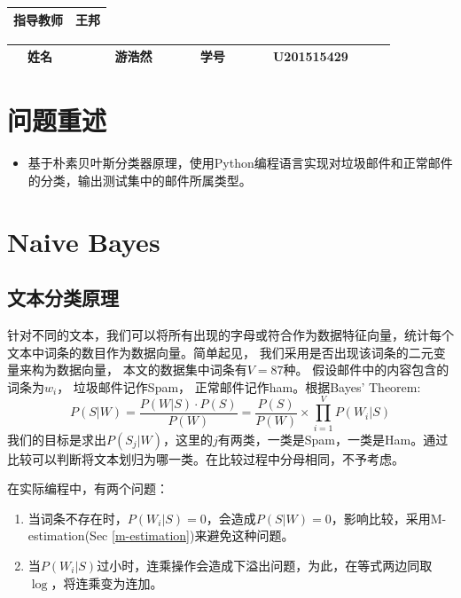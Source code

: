 \documentclass[UTF-8, a4paper, 11pt]{article}
\numberwithin{equation}{section}
\begin{document}
\begin{titlepage}
\begin{center}
\begin{table}[!hbp]
\begin{tabular}{|c|c|}
     		\hline
     		指导教师 & 王邦 \\
     		\hline
     		\end{tabular}     		
       \end{table}
       \vspace{2cm}
      \begin{table}[htbp]
      \centering
      \renewcommand\arraystretch{1.5}
     	\begin{tabular}{|c|c|c|c|}
     		\hline
            \qquad ~~姓名~~~~~  & \qquad ~~游浩然~~~~~  & \qquad 学号~~~~~ & \qquad U201515429~~~~~ \\
     		\hline
     		\end{tabular}
       \end{table}
       \date{2018年5月20日}
     \end{center}
\end{titlepage}

\section{问题重述}
\begin{itemize}
  \item 基于朴素贝叶斯分类器原理，使用Python编程语言实现对垃圾邮件和正常邮件的分类，输出测试集中的邮件所属类型。
\end{itemize}

\section{Naive Bayes}
\subsection{文本分类原理}
针对不同的文本，我们可以将所有出现的字母或符合作为数据特征向量，统计每个文本中词条的数目作为数据向量。简单起见， 我们采用是否出现该词条的二元变量来构为数据向量， 本文的数据集中词条有$V=87$种。
假设邮件中的内容包含的词条为$w_i$， 垃圾邮件记作Spam， 正常邮件记作ham。根据Bayes' Theorem:
\begin{equation}\label{ep:eqs}
  P(S|W)=\frac{P(W|S) \cdot P(S)}{P(W)} = \frac{P(S)}{P(W)}\times \prod_{i=1}^{V} P(W_i|S)
\end{equation}
我们的目标是求出$P(S_j|W)$，这里的$j$有两类，一类是Spam，一类是Ham。通过比较可以判断将文本划归为哪一类。在比较过程中分母相同，不予考虑。

在实际编程中，有两个问题：
\begin{enumerate}
  \item 当词条不存在时，$P(W_i|S)=0$，会造成$P(S|W)=0$，影响比较，采用M-estimation(Sec \ref{m-estimation})来避免这种问题。
  \item 当$P(W_i|S)$过小时，连乘操作会造成下溢出问题，为此，在等式两边同取$\log$，将连乘变为连加。
\end{enumerate}
\end{document}
